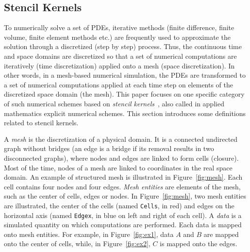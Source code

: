 \subsection{Stencil Kernels}
\label{sect:stencil}
To numerically solve a set of PDEs, iterative methods (finite difference, finite volume, finite element methods etc.) are frequently used to approximate the solution through a discretized (step by step) process. Thus, the continuous time and space domains are discretized so that a set of numerical computations are iteratively (time discretization) applied onto a mesh (space discretization). In other words, in a mesh-based numerical simulation, the PDEs are transformed to a set of numerical computations applied at each time step on elements of the discretized space domain (the mesh).
This paper focuses on one specific category of such numerical schemes based on \textit{stencil kernels}~\cite{spaaTangCKLL11}, also called in applied mathematics explicit numerical schemes.
This section introduces some definitions related to stencil kernels.

A \emph{mesh} is the discretization of a physical domain. It is a connected undirected graph without bridges (an edge is a bridge if its removal results in two disconnected graphs), where nodes and edges are linked to form cells (closure). Most of the time, nodes of a mesh are linked to coordinates in the real space domain. An example of structured mesh is illustrated in Figure~\ref{fig:mesh}. Each cell contains four nodes and four edges. \emph{Mesh entities} are elements of the mesh, such as the center of cells, edges or nodes. In Figure~\ref{fig:mesh}, two mesh entities are illustrated, the center of the cells (named \texttt{Cells}, in red) and edges on the horizontal axis (named \texttt{Edgex}, in blue on left and right of each cell). A \emph{data} is a simulated quantity on which computations are performed. Each data is mapped onto mesh entities. For example, in Figure~\ref{fig:ex1}, data $A$ and $B$ are mapped onto the center of cells, while, in Figure~\ref{fig:ex2}, $C$ is mapped onto the edges.


